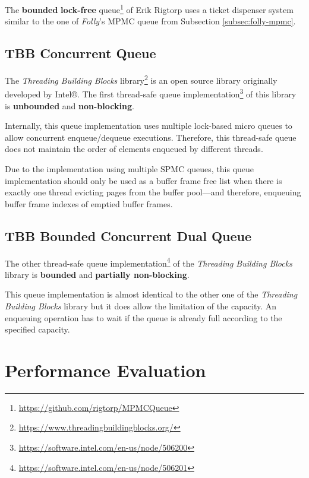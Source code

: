 	The \textbf{bounded} \textbf{lock-free} queue\footnote{\url{https://github.com/rigtorp/MPMCQueue}} of Erik Rigtorp uses a ticket dispenser system similar to the one of \textit{Folly}'s MPMC queue from Subsection \ref{subsec:folly-mpmc}.

\subsection[TBB Concurrent Queue]{TBB Concurrent Queue} \label{subsec:intel-unbounded}

	The \textit{Threading Building Blocks} library\footnote{\url{https://www.threadingbuildingblocks.org/}} is an open source library originally developed by Intel®. The first thread-safe queue implementation\footnote{\url{https://software.intel.com/en-us/node/506200}} of this library is \textbf{unbounded} and \textbf{non-blocking}.
	
	Internally, this queue implementation uses multiple lock-based micro queues to allow concurrent enqueue/dequeue executions. Therefore, this thread-safe queue does not maintain the order of elements enqueued by different threads.

    Due to the implementation using multiple SPMC queues, this queue implementation should only be used as a buffer frame free list when there is exactly one thread evicting pages from the buffer pool---and therefore, enqueuing buffer frame indexes of emptied buffer frames.

\subsection[TBB Bounded Concurrent Queue]{TBB Bounded Concurrent Dual Queue} \label{subsec:intel-bounded}

	The other thread-safe queue implementation\footnote{\url{https://software.intel.com/en-us/node/506201}} of the \textit{Threading Building Blocks} library is \textbf{bounded} and \textbf{partially non-blocking}.
	
	This queue implementation is almost identical to the other one of the \textit{Threading Building Blocks} library but it does allow the limitation of the capacity. An enqueuing operation has to wait if the queue is already full according to the specified capacity.

\section[Performance Evaluation]{Performance Evaluation} \label{sec:free-list-performance}

